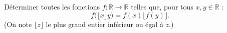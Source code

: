 Déterminer toutes les fonctions $f : \mathbb{R} \to \mathbb{R}$ telles que, pour tous $x, y \in \mathbb{R}$ :
\[
f\bigl(\lfloor x \rfloor y\bigr) = f(x)\bigl\lfloor f(y) \bigr\rfloor.
\]
(On note $\lfloor z \rfloor$ le plus grand entier inférieur ou égal à $z$.)

